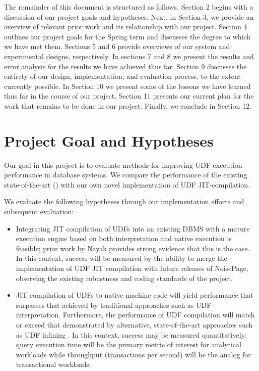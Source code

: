 \documentclass{vldb}
\begin{document}
The remainder of this document is structured as follows. Section 2 begins with a discussion of our project goals and hypotheses. Next, in Section 3, we provide an overview of relevant prior work and its relationship with our project. Section 4 outlines our project goals for the Spring term and discusses the degree to which we have met them. Sections 5 and 6 provide overviews of our system and experimental designs, respectively. In sections 7 and 8 we present the results and error analysis for the results we have achieved thus far. Section 9 discusses the entirety of our design, implementation, and evaluation process, to the extent currently possible. In Section 10 we present some of the lessons we have learned thus far in the course of our project. Section 11 presents our current plan for the work that remains to be done in our project. Finally, we conclude in Section 12.


\section{Project Goal and Hypotheses}

Our goal in this project is to evaluate methods for improving UDF execution performance in database systems. We compare the performance of the existing state-of-the-art (\cite{froid, apfel, aggify}) with our own novel implementation of UDF JIT-compilation.

We evaluate the following hypotheses through our implementation efforts and subsequent evaluation:

\begin{itemize}
    \item Integrating JIT compilation of UDFs into an existing DBMS with a mature execution engine based on both interpretation and native execution is feasible; prior work by Nayak \cite{tanuj} provides strong evidence that this is the case. In this context, success will be measured by the ability to merge the implementation of UDF JIT compilation with future releases of NoisePage, observing the existing robustness and coding standards of the project.
    \item JIT compilation of UDFs to native machine code will yield performance that surpasses that achieved by traditional approaches such as UDF interpretation. Furthermore, the performance of UDF compilation will match or exceed that demonstrated by alternative, state-of-the-art approaches such as UDF inlining \cite{apfel, froid, aggify}. In this context, success may be measured quantitatively: query execution time will be the primary metric of interest for analytical workloads while throughput (transactions per second) will be the analog for transactional workloads.
\end{itemize}
\end{document}
